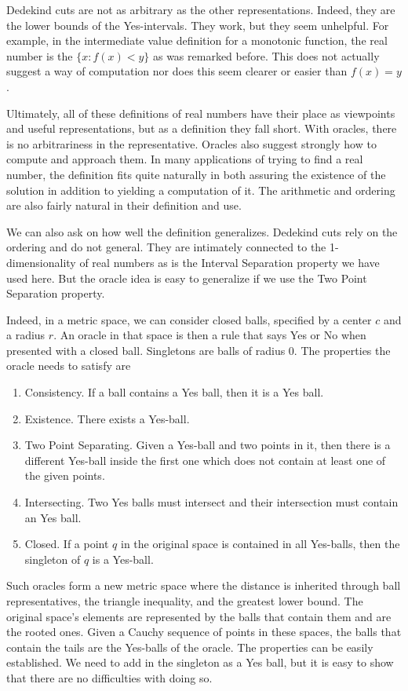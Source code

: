 \documentclass[12pt]{article}
\theoremstyle{remark}
\begin{document}
Dedekind cuts are not as arbitrary as the other representations. Indeed, they are the lower bounds of the Yes-intervals. They work, but they seem unhelpful. For example, in the intermediate value definition for a monotonic function, the real number is the $\{x: f(x) < y\}$ as was remarked before. This does not actually suggest a way of computation nor does this seem clearer or easier than $f(x) = y$. 

Ultimately, all of these definitions of real numbers have their place as viewpoints and useful representations, but as a definition they fall short. With oracles, there is no arbitrariness in the representative. Oracles also suggest strongly how to compute and approach them. In many applications of trying to find a real number, the definition fits quite naturally in both assuring the existence of the solution in addition to yielding a computation of it. The arithmetic and ordering are also fairly natural in their definition and use. 

We can also ask on how well the definition generalizes. Dedekind cuts rely on the ordering and do not general. They are intimately connected to the 1-dimensionality of real numbers as is the Interval Separation property we have used here. But the oracle idea is easy to generalize if we use the Two Point Separation property. 

Indeed, in a metric space, we can consider closed balls, specified by a center $c$ and a radius $r$. An oracle in that space is then a rule that says Yes or No when presented with a closed ball. Singletons are balls of radius $0$. The properties the oracle needs to satisfy are
\begin{enumerate}
    \item Consistency. If a ball contains a Yes ball, then it is a Yes ball. 
    \item Existence. There exists a Yes-ball.
    \item Two Point Separating. Given a Yes-ball and two points in it, then there is a different Yes-ball inside the first one which does not contain at least one of the given points. 
    \item Intersecting. Two Yes balls must intersect and their intersection must contain an Yes ball.
    \item Closed. If a point $q$ in the original space is contained in all Yes-balls, then the singleton of $q$ is a Yes-ball.
\end{enumerate}

Such oracles form a new metric space where the distance is inherited through ball representatives, the triangle inequality, and the greatest lower bound. The original space's elements are represented by the balls that contain them and are the rooted ones. Given a Cauchy sequence of points in these spaces, the balls that contain the tails are the Yes-balls of the oracle. The properties can be easily established. We need to add in the singleton as a Yes ball, but it is easy to show that there are no difficulties with doing so. 
\end{document}
